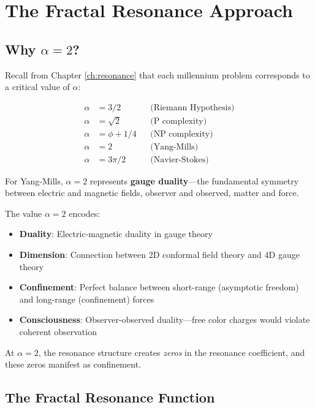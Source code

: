 \section{The Fractal Resonance Approach}

\subsection{Why \texorpdfstring{$\alpha = 2$}{alpha = 2}?}

Recall from Chapter \ref{ch:resonance} that each millennium problem corresponds to a critical value of $\alpha$:

\begin{align}
\alpha &= 3/2 && \text{(Riemann Hypothesis)} \\
\alpha &= \sqrt{2} && \text{(P complexity)} \\
\alpha &= \phi + 1/4 && \text{(NP complexity)} \\
\alpha &= 2 && \text{(Yang-Mills)} \\
\alpha &= 3\pi/2 && \text{(Navier-Stokes)}
\end{align}

For Yang-Mills, $\boxed{\alpha = 2}$ represents \textbf{gauge duality}---the fundamental symmetry between electric and magnetic fields, observer and observed, matter and force.

\begin{keyidea}
The value $\alpha = 2$ encodes:
\begin{itemize}
\item \textbf{Duality}: Electric-magnetic duality in gauge theory
\item \textbf{Dimension}: Connection between 2D conformal field theory and 4D gauge theory
\item \textbf{Confinement}: Perfect balance between short-range (asymptotic freedom) and long-range (confinement) forces
\item \textbf{Consciousness}: Observer-observed duality—free color charges would violate coherent observation
\end{itemize}

At $\alpha = 2$, the resonance structure creates \textit{zeros} in the resonance coefficient, and these zeros manifest as confinement.
\end{keyidea}

\subsection{The Fractal Resonance Function}

